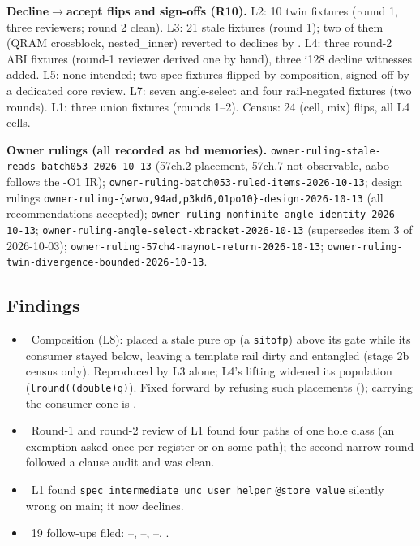 \textbf{Decline$\to$accept flips and sign-offs (R10).} L2: 10 twin fixtures (round 1, three reviewers; round 2 clean). L3: 21 stale fixtures (round 1); two of them (QRAM crossblock, nested\_inner) reverted to declines by . L4: three round-2 ABI fixtures (round-1 reviewer derived one by hand), three i128 decline witnesses added. L5: none intended; two spec fixtures flipped by composition, signed off by a dedicated core review. L7: seven angle-select and four rail-negated fixtures (two rounds). L1: three union fixtures (rounds 1--2). Census: 24 (cell, mix) flips, all L4 cells.

\textbf{Owner rulings (all recorded as bd memories).} \texttt{owner-ruling-stale-reads-batch053-2026-10-13} (57ch.2 placement, 57ch.7 not observable, aabo follows the -O1 IR); \texttt{owner-ruling-batch053-ruled-items-2026-10-13}; design rulings \texttt{owner-ruling-\{wrwo,94ad,p3kd6,01po10\}-design-2026-10-13} (all recommendations accepted); \texttt{owner-ruling-nonfinite-angle-identity-2026-10-13}; \texttt{owner-ruling-angle-select-xbracket-2026-10-13} (supersedes item 3 of 2026-10-03); \texttt{owner-ruling-57ch4-maynot-return-2026-10-13}; \texttt{owner-ruling-twin-divergence-bounded-2026-10-13}.

\subsection*{Findings}
\begin{itemize}
\item \fconfirmed\ Composition (L8):  placed a stale pure op (a \texttt{sitofp}) above its gate while its consumer stayed below, leaving a template rail dirty and entangled (stage 2b census only). Reproduced by L3 alone; L4's lifting widened its population (\texttt{lround((double)q)}). Fixed forward by refusing such placements (); carrying the consumer cone is .
\item \fconfirmed\ Round-1 and round-2 review of L1 found four paths of one hole class (an exemption asked once per register or on some path); the second narrow round followed a clause audit and was clean.
\item \fpreexisting\ L1 found \texttt{spec\_intermediate\_unc\_user\_helper} \texttt{@store\_value} silently wrong on main; it now declines.
\item \foverdecline\ 19 follow-ups filed: --, --, --, .
\end{itemize}

